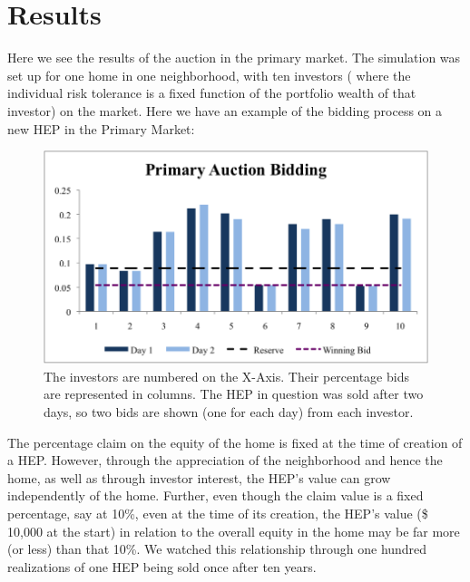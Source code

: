 \documentclass[twoside]{article}
\begin{document}
\section{Results}
Here we see the results of the auction in the primary market. The simulation was set up for one home in one neighborhood, with ten investors ( where the individual risk tolerance is a fixed function of the portfolio wealth of that investor) on the market. Here we have an example of the bidding process on a new HEP in the Primary Market:

\begin{figure}[h!]
  \centering
      \includegraphics[scale=.7]{PrimaryAuction.png}
  \caption{The investors are numbered on the X-Axis. Their percentage bids are represented in columns. The HEP in question was sold after two days, so two bids are shown (one for each day) from each investor.}
\end{figure}

The percentage claim on the equity of the home is fixed at the time of creation of a HEP. However, through the appreciation of the neighborhood and hence the home, as well as through investor interest, the HEP's value can grow independently of the home. Further, even though the claim value is a fixed percentage, say at 10\%, even at the time of its creation, the HEP's value (\$ 10,000 at the start) in relation to the overall equity in the home may be far more (or less) than that 10\%. We watched this relationship through one hundred realizations of one HEP being sold once after ten years.
\end{document}
